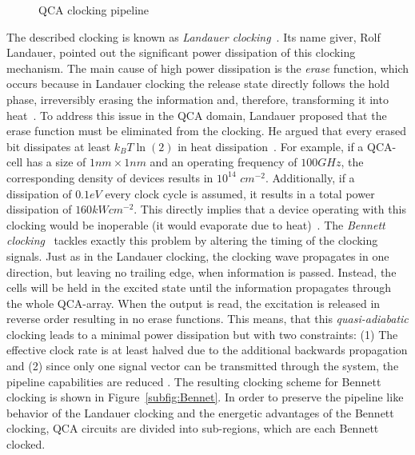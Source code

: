 
\begin{figure}
	\centering
	\caption{QCA clocking pipeline} \label{fig:QCAClockpipeline}
\end{figure}


The described clocking is known as \textit{Landauer clocking}~\cite{lent1997device}. Its name giver, Rolf Landauer, pointed out the significant power dissipation of this clocking mechanism. The main cause of high power dissipation is the \textit{erase} function, which occurs because in Landauer clocking the release state directly follows the hold phase, irreversibly erasing the information and, therefore, transforming it into heat~\cite{landauer1961irreversibility}. To address this issue in the QCA domain, Landauer proposed that the erase function must be eliminated from the clocking. He argued that every erased bit dissipates at least $k_BT\ln(2)$ in heat dissipation~\cite{keyes1970minimal}. For example, if a QCA-cell has a size of $1nm \times 1nm$ and an operating frequency of $100 GHz$, the corresponding density of devices results in $10^{14}$ $cm^{-2}$. Additionally, if a dissipation of $0.1 eV$ every clock cycle is assumed, it results in a total power dissipation of $160 kW cm^{-2}$. This directly implies that a device operating with this clocking would be inoperable (it would evaporate due to heat)~\cite{lent2006bennett}. The \textit{Bennett clocking}~\cite{lent2006bennett} tackles exactly this problem by altering the timing of the clocking signals. Just as in the Landauer clocking, the clocking wave propagates in one direction, but leaving no trailing edge, when information is passed. Instead, the cells will be held in the excited state until the information propagates through the whole QCA-array. When the output is read, the excitation is released in reverse order resulting in no erase functions. This means, that this \textit{quasi-adiabatic} clocking leads to a minimal power dissipation but with two constraints: (1) The effective clock rate is at least halved due to the additional backwards propagation and (2) since only one signal vector can be transmitted through the system, the pipeline capabilities are reduced \cite{lent2006bennett}. The resulting clocking scheme for Bennett clocking is shown in Figure~\ref{subfig:Bennet}. In order to preserve the pipeline like behavior of the Landauer clocking and the energetic advantages of the Bennett clocking, QCA circuits are divided into sub-regions, which are each Bennett clocked.

